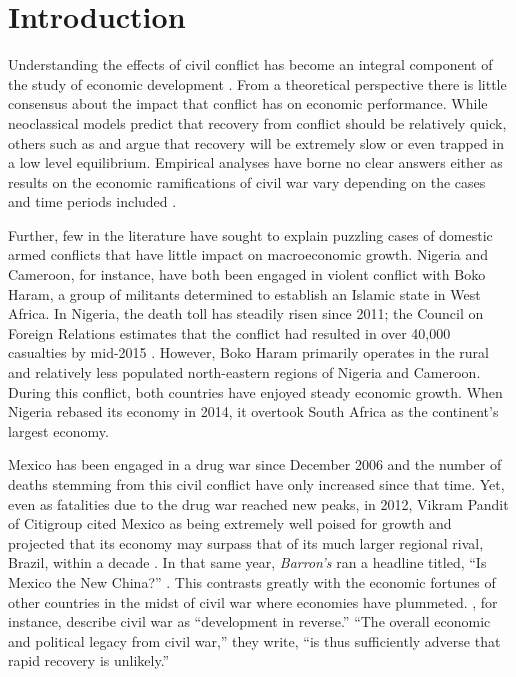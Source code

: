 
\section{Introduction}
\label{intro}

Understanding the effects of civil conflict has become an integral component of the study of economic development \citep{serneels:verpoorten:2013}. From a theoretical perspective there is little consensus about the impact that conflict has on economic performance. While neoclassical models predict that recovery from conflict should be relatively quick, others such as \citet{barro:martin:2004} and \citet{sachs:2006} argue that recovery will be extremely slow or even trapped in a low level equilibrium. Empirical analyses have borne no clear answers either as results on the economic ramifications of civil war vary depending on the cases and time periods included \citep{kang:meernik:2005}. 

Further, few in the literature have sought to explain puzzling cases of domestic armed conflicts that have little impact on macroeconomic growth. Nigeria and Cameroon, for instance, have both been engaged in violent conflict with Boko Haram, a group of militants determined to establish an Islamic state in West Africa. In Nigeria, the death toll has steadily risen since 2011; the Council on Foreign Relations estimates that the conflict had resulted in over 40,000 casualties by mid-2015 \citep{CFR:2015}. However, Boko Haram primarily operates in the rural and relatively less populated north-eastern regions of Nigeria and Cameroon. During this conflict, both countries have enjoyed steady economic growth. When Nigeria rebased its economy in 2014, it overtook South Africa as the continent's largest economy.

Mexico has been engaged in a drug war since December 2006 and the number of deaths stemming from this civil conflict have only increased since that time. Yet, even as fatalities due to the drug war reached new peaks, in 2012, Vikram Pandit of Citigroup cited Mexico as being extremely well poised for growth and projected that its economy may surpass that of its much larger regional rival, Brazil, within a decade \citep{vardi:2012}. In that same year, \emph{Barron's} ran a headline titled, ``Is Mexico the New China?'' \citep{kapadia:2012}. This contrasts greatly with the economic fortunes of other countries in the midst of civil war where economies have plummeted. \citet{collier:elliott:etal:2003}, for instance, describe civil war as ``development in reverse.'' ``The overall economic and political legacy from civil war,'' they write, ``is thus sufficiently adverse that rapid recovery is unlikely.''  


